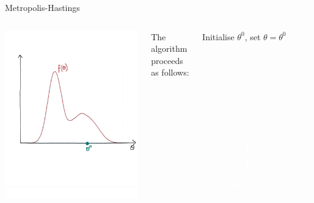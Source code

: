 \documentclass[compress]{beamer}
\begin{document}
\begin{frame}[label=sec-7-2]{Metropolis-Hastings}
\begin{columns}[c] 
\includegraphics[width=1\linewidth]{MH1}

The algorithm proceeds as follows:\\
\begin{enumerate}
\item Initialise $\theta^{0}$, set $\theta = \theta^{0}$
\textcolor{white}{
\item[\color{white}] Sample $\theta^* \sim q(\theta^*|\theta)$
\item[\color{white}] Compute acceptance probability, r
\item[\color{white}] Draw $u \sim Uniform[0,1]$
\item[\color{white}] Set new sample to 
\[
 \theta^{(s+1)} = 
\begin{cases}
    \theta^*, & \text{if } u < r\\
    \theta^{(s)}, & \text{if } u \geqslant r
\end{cases}
\]
\item[\color{white}] Repeat steps 2-5
}
\end{enumerate}
\end{columns}
\end{frame}
\end{document}
